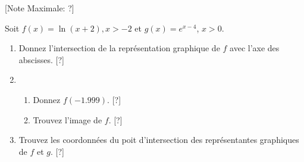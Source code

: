 \begin{question}
  \hspace*{\fill} [Note Maximale: ?]\par
  \noindent Soit $f(x) = \ln(x +2), x > -2$ et $g(x) = e^{x-4}$, $x > 0$.\par
  \begin{enumerate}[label=(\alph*)]
    \item Donnez l'intersection de la représentation graphique de $f$ avec l'axe des abscisses.\hspace*{\fill} [?]
    \item
      \begin{enumerate}[label=(\roman*)]
        \item Donnez $f(-1.999)$.\hspace*{\fill} [?]
        \item Trouvez l'image de $f$.\hspace*{\fill} [?]
      \end{enumerate}
    \item Trouvez les coordonnées du poit d'intersection des représentantes graphiques de $f$ et $g$.\hspace*{\fill} [?]
  \end{enumerate}
\end{question}
